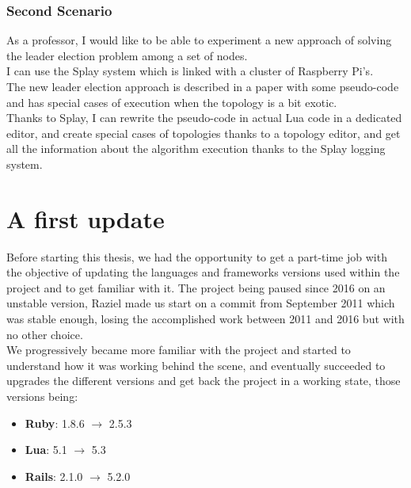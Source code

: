 \documentclass{eplmastersthesis}
\begin{document}
        \subsubsection{Second Scenario}

          As a professor, I would like to be able to experiment a new
          approach of solving the leader election problem among a set of
          nodes.\\
          I can use the Splay system which is linked with a cluster of
          Raspberry Pi's.\\
          The new leader election approach is described in a paper with some
          pseudo-code and has special cases of execution when the topology is
          a bit exotic.\\
          Thanks to Splay, I can rewrite the pseudo-code in actual Lua code
          in a dedicated editor, and create special cases of topologies
          thanks to a topology editor, and get all the information about
          the algorithm execution thanks to the Splay logging system.

    \section{A first update}

      Before starting this thesis, we had the opportunity to get a part-time
      job with the objective of updating the languages and frameworks versions
      used within the project and to get familiar with it. The project being
      paused since 2016 on an unstable version, Raziel made us start on a
      commit from September 2011 which was stable enough, losing the
      accomplished work between 2011 and 2016 but with no other choice.\\

      We progressively became more familiar with the project and started to
      understand how it was working behind the scene, and eventually succeeded
      to upgrades the different versions and get back the project in a working
      state, those versions being:

      \begin{itemize}
        \item \textbf{Ruby}: 1.8.6 $\rightarrow$ 2.5.3
        \item \textbf{Lua}: 5.1 $\rightarrow$ 5.3
        \item \textbf{Rails}: 2.1.0 $\rightarrow$ 5.2.0
      \end{itemize}
\end{document}
